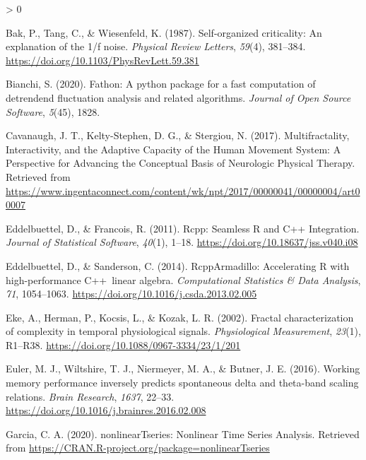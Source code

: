 \documentclass[
  english,
  man]{apa6}
\newlength{\cslhangindent}
\newenvironment{CSLReferences}[2] %
 {%
  \setlength{\parindent}{0pt}
  \ifodd #1 \everypar{\setlength{\hangindent}{\cslhangindent}}\ignorespaces\fi
  \ifnum #2 > 0
  \setlength{\parskip}{#2\baselineskip}
  \fi
 }%
 {}
\begin{document}
\begin{CSLReferences}{1}{0}
\leavevmode\hypertarget{ref-bakSelforganizedCriticalityExplanation1987}{}%
Bak, P., Tang, C., \& Wiesenfeld, K. (1987). Self-organized criticality: {An} explanation of the 1/f noise. \emph{Physical Review Letters}, \emph{59}(4), 381--384. \url{https://doi.org/10.1103/PhysRevLett.59.381}

\leavevmode\hypertarget{ref-bianchi2020}{}%
Bianchi, S. (2020). Fathon: A python package for a fast computation of detrendend fluctuation analysis and related algorithms. \emph{Journal of Open Source Software}, \emph{5}(45), 1828.

\leavevmode\hypertarget{ref-cavanaugh2017}{}%
Cavanaugh, J. T., Kelty-Stephen, D. G., \& Stergiou, N. (2017). Multifractality, Interactivity, and the Adaptive Capacity of the Human Movement System: A Perspective for Advancing the Conceptual Basis of Neurologic Physical Therapy. Retrieved from \url{https://www.ingentaconnect.com/content/wk/npt/2017/00000041/00000004/art00007}

\leavevmode\hypertarget{ref-eddelbuettelRcppSeamlessIntegration2011}{}%
Eddelbuettel, D., \& Francois, R. (2011). Rcpp: {Seamless} {R} and {C}++ {Integration}. \emph{Journal of Statistical Software}, \emph{40}(1), 1--18. \url{https://doi.org/10.18637/jss.v040.i08}

\leavevmode\hypertarget{ref-eddelbuettelRcppArmadilloAcceleratingHighperformance2014}{}%
Eddelbuettel, D., \& Sanderson, C. (2014). {RcppArmadillo}: {Accelerating} {R} with high-performance {C}++~linear algebra. \emph{Computational Statistics \& Data Analysis}, \emph{71}, 1054--1063. \url{https://doi.org/10.1016/j.csda.2013.02.005}

\leavevmode\hypertarget{ref-ekeFractalCharacterizationComplexity2002}{}%
Eke, A., Herman, P., Kocsis, L., \& Kozak, L. R. (2002). Fractal characterization of complexity in temporal physiological signals. \emph{Physiological Measurement}, \emph{23}(1), R1--R38. \url{https://doi.org/10.1088/0967-3334/23/1/201}

\leavevmode\hypertarget{ref-eulerWorkingMemoryPerformance2016}{}%
Euler, M. J., Wiltshire, T. J., Niermeyer, M. A., \& Butner, J. E. (2016). Working memory performance inversely predicts spontaneous delta and theta-band scaling relations. \emph{Brain Research}, \emph{1637}, 22--33. \url{https://doi.org/10.1016/j.brainres.2016.02.008}

\leavevmode\hypertarget{ref-garciaNonlinearTseriesNonlinearTime2020}{}%
Garcia, C. A. (2020). {nonlinearTseries}: {Nonlinear} {Time} {Series} {Analysis}. Retrieved from \url{https://CRAN.R-project.org/package=nonlinearTseries}


\end{CSLReferences}
\end{document}
